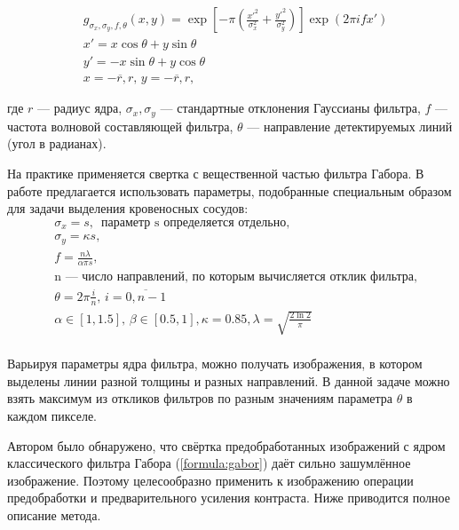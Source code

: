 \documentclass[12pt,fleqn]{article}
\begin{document}
\begin{equation}
\begin{split}
&g_{\sigma_x, \sigma_y, f, \theta}(x, y) = \exp\left[ -\pi \left(  \frac{x'^2}{\sigma_x^2} + \frac{y'^2}{\sigma_y^2} \right) \right] \exp\left( 2\pi i f x' \right) \\
&x' = x\cos\theta + y\sin\theta \\ 
&y' = -x\sin\theta + y\cos\theta \\
&x = \overline{-r, r}, \, y = \overline{-r, r},
\end{split}
\label{formula:gabor}
\end{equation}

где $r$ --- радиус ядра, $\sigma_x, \sigma_y$ --- стандартные отклонения Гауссианы фильтра, $f$ --- частота волновой составляющей фильтра, $\theta$ --- направление детектируемых линий (угол в радианах).

На практике применяется свертка с вещественной частью фильтра Габора. В работе \cite{qui_li} предлагается использовать параметры, подобранные специальным образом для задачи выделения кровеносных сосудов: 
\begin{equation}
\begin{split}
&\sigma_x = s, \, \text{   параметр s определяется отдельно}, \\
&\sigma_y = \kappa s,\\
&f = \frac{n\lambda}{\alpha \pi s}, \\ 
&\text{n --- число направлений, по которым вычисляется отклик фильтра}, \\
&\theta = 2\pi \frac{i}{n},\, i = \overline{0, n-1} \\
&\alpha \in [1, 1.5],\, \beta \in [0.5, 1], \kappa = 0.85, \lambda = \sqrt{\frac{2 \ln{2}}{\pi}} \\
\end{split}
\label{formula:gabor_params}
\end{equation}

Варьируя параметры ядра фильтра, можно получать изображения, в котором выделены линии разной толщины и разных направлений. В данной задаче можно взять максимум из откликов фильтров по разным значениям параметра $\theta$ в каждом пикселе.

Автором было обнаружено, что свёртка предобработанных изображений с ядром классического фильтра Габора (\ref{formula:gabor}) даёт сильно зашумлённое изображение. Поэтому целесообразно применить к изображению операции предобработки и предварительного усиления контраста. Ниже приводится полное описание метода.
\end{document}
